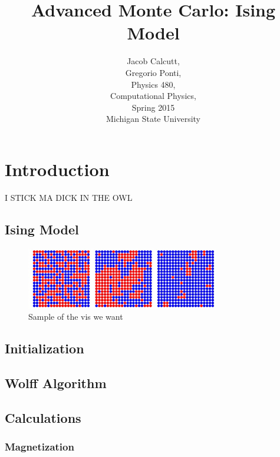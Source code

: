 \documentclass[letterpaper,12pt]{article}
\numberwithin{equation}{subsection}
\begin{document}
\title{\textbf{Advanced Monte Carlo: Ising Model}}
\author{Jacob Calcutt,\\
	Gregorio Ponti,\\
	Physics 480, \\
	Computational Physics,\\
	Spring 2015\\
	Michigan State University}
\maketitle

\newpage
\tableofcontents

\newpage
\section{Introduction}
I STICK MA DICK IN THE OWL
\subsection{Ising Model}
\begin{figure}[H]
        \centering
        \caption{Sample of the vis we want \label{fig:blah}}
                \centering
                \includegraphics[width=0.75\textwidth]{sample_lattice.png}
\end{figure}

\newpage

\subsection{Initialization}

\subsection{Wolff Algorithm}
\subsection{Calculations}
\subsubsection{Magnetization}
\end{document}
